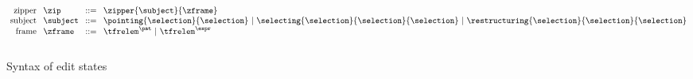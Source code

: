 \begin{figure}
  \vspace{-3px}
  \[
  \arraycolsep=4pt\begin{array}{rlrl}
    \text{zipper} & \zip & ::= & \zipper{\subject}{\zframe} \\
    \text{subject} & \subject & ::= &
      \pointing{\selection}{\selection} ~\vert~
      \selecting{\selection}{\selection}{\selection} ~\vert~
      \restructuring{\selection}{\selection}{\selection} \\
    \text{frame} & \zframe & ::= &
      \tfrelem^{\pat} ~\vert~
      \tfrelem^{\expr} \\\\

  \end{array}\]
  \caption{
    Syntax of edit states 
  }
  \label{fig:edit-state-syntax}
\end{figure}